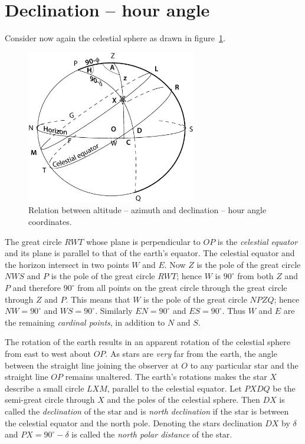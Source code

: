 	\section{Declination -- hour angle}

Consider now again the celestial sphere as drawn in figure~\ref{fig:hr-dec}.

\begin{figure}[h]
\centering
\includegraphics[width=0.66\textwidth]{hr-dec.eps}
\caption{Relation between altitude -- azimuth and declination -- hour angle
coordinates.}
\label{fig:hr-dec}
\end{figure}

The great circle $RWT$ whose plane is perpendicular to $OP$ is the
{\it celestial equator} and its plane is parallel to that of the
earth's equator. The celestial equator and the horizon intersect in
two points $W$ and $E$. Now $Z$ is the pole of the great circle $NWS$
and $P$ is the pole of the great circle $RWT$; hence $W$ is $90^\circ$
from both $Z$ and $P$ and therefore $90^\circ$ from all points on the
great circle through the great circle through $Z$ and $P$. This means
that $W$ is the pole of the great circle $NPZQ$; hence $NW=90^\circ$
and $WS=90^\circ$. Similarly  $EN=90^\circ$ and  $ES=90^\circ$. Thus
$W$ and $E$ are the remaining {\it cardinal points}, in addition to
$N$ and $S$. 

The rotation of the earth results in an apparent rotation of the
celestial sphere from east to west about $OP$. As stars are {\it very}
far from the earth, the angle between the straight line joining the
observer at $O$ to any particular star and the straight line $OP$
remains unaltered. The earth's rotations makes the star $X$ describe a
small circle $LXM$, parallel to the celestial equator. Let $PXDQ$ be
the semi-great circle through $X$ and the poles of the celestial
sphere. Then $DX$ is called the {\it declination} of the star and is
{\it north declination} if the star is between the celestial equator and
the north pole. Denoting the stars declination $DX$ by $\delta$ and
$PX=90^\circ-\delta$ is called the {\it north polar distance} of the
star. 

